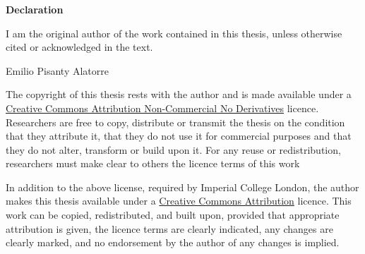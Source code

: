 




\chapter*{$\quad$}
\vspace{-2cm}

\noindent
\textbf{Declaration}


\noindent
I am the original author of the work contained in this thesis, unless otherwise cited or acknowledged in the text.

\vspace{0.5cm}

\noindent
Emilio Pisanty Alatorre
\\ \noindent 
\declarationdate


\vfill

\noindent
The copyright of this thesis rests with the author and is made available under a \href{http://creativecommons.org/licenses/by-nc-nd/4.0/}{Creative Commons Attribution Non-Commercial No Derivatives} licence. Researchers are free to copy, distribute or transmit the thesis on the condition that they attribute it, that they do not use it for commercial purposes and that they do not alter, transform or build upon it. For any reuse or redistribution, researchers must make clear to others the licence terms of this work

\vspace{7mm}

\noindent
In addition to the above license, required by Imperial College London, the author makes this thesis available under a \href{http://creativecommons.org/licenses/by/4.0/}{Creative Commons Attribution} licence. This work can be copied, redistributed, and built upon, provided that appropriate attribution is given, the licence terms are clearly indicated, any changes are clearly marked, and no endorsement by the author of any changes is implied.

\vspace{1cm}






